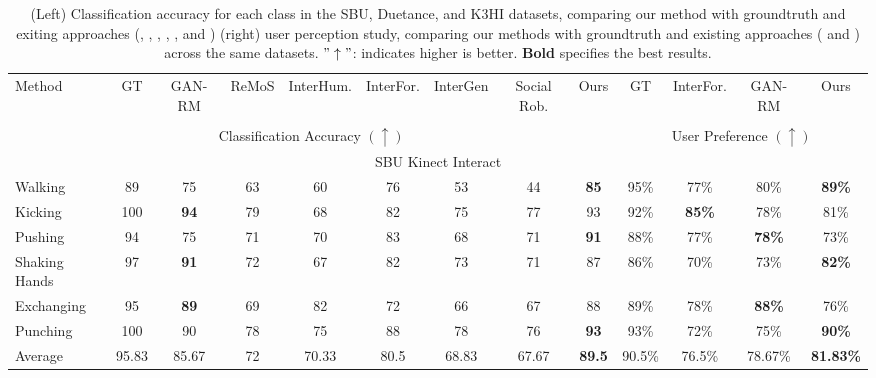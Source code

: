 \begin{table}
	\centering
	\caption{(Left) Classification accuracy for each class in the SBU, Duetance, and K3HI datasets, comparing our method with groundtruth and exiting approaches (\cite{gan-reaction-motion}, \cite{remos}, \cite{interaction-humanoid}, \cite{interaction_transformer}, \cite{intergen}, and \cite{social-robot}) (right) user perception study, comparing our methods with groundtruth and existing approaches (\cite{interaction_transformer} and \cite{gan-reaction-motion}) across the same datasets. $"\uparrow"$: indicates higher is better. \textbf{Bold} specifies the best results.}
	\label{table_sota_classification_user}
	\renewcommand{\arraystretch}{1.0}
		\begin{tabular*}{1.0\textwidth}{@{\extracolsep{\fill}}l|cccccccc|cccc}	
			\toprule			
			\multirow{2}{*}{Method} &
			GT  &
			GAN-RM  &
			ReMoS  &
			InterHum.  &
			InterFor.  &
			InterGen  &
			Social Rob. &
			Ours &
			GT &
			InterFor. &
			GAN-RM &
			Ours \\ 
			
			&
			&
			\cite{gan-reaction-motion} &
			\cite{remos} &
			\cite{interaction-humanoid} &
			\cite{interaction_transformer} &
			\cite{intergen} &
			\cite{social-robot} &
			&
			&
			\cite{interaction_transformer} &
			\cite{gan-reaction-motion} &
			\\ \hline
			
			\multicolumn{9}{c}{Classification Accuracy $(\uparrow)$} &
			\multicolumn{4}{c}{User Preference $(\uparrow)$} \\ 
			\midrule
			
			\multicolumn{13}{c}{SBU Kinect Interact} \\ 
			\midrule
			
			
			
			
			Walking &89&75&63&60&76&53&44&\textbf{85}&95\%&77\%&80\%&\textbf{89\%}\\
			Kicking &100&\textbf{94}&79&68&82&75&77&93&92\%&\textbf{85\%}&78\%&81\%\\
			Pushing &94&75&71&70&83&68&71&\textbf{91}&88\%&77\%&\textbf{78\%}&73\%\\
			Shaking Hands &97&\textbf{91}&72&67&82&73&71&87&86\%&70\%&73\%&\textbf{82\%}\\
			Exchanging &95&\textbf{89}&69&82&72&66&67&88&89\%&78\%&\textbf{88\%}&76\%\\
			Punching &100&90&78&75&88&78&76&\textbf{93}&93\%&72\%&75\%&\textbf{90\%}\\
			Average &95.83&85.67&72&70.33&80.5&68.83&67.67&\textbf{89.5}&90.5\%&76.5\%&78.67\%&\textbf{81.83\%}\\ 
			\midrule
			

\end{tabular*}
\end{table}
